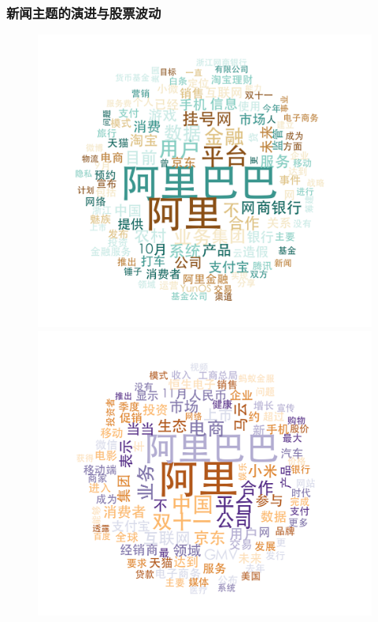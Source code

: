 \documentclass[11pt]{beamer}
\begin{document}
\begin{frame}
  \frametitle{新闻主题的演进与股票波动}
  \begin{figure}
    \centering
    \includegraphics[height=0.28\textheight]{plot/Sep-Oct-wordcloud}    \includegraphics[height=0.28\textheight]{plot/Nov-wordcloud}

\end{figure}
\end{frame}
\end{document}
